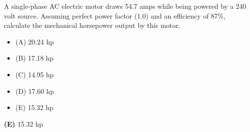 

A single-phase AC electric motor draws 54.7 amps while being powered by a 240 volt source.  Assuming perfect power factor (1.0) and an efficiency of 87\%, calculate the mechanical horsepower output by this motor.

\begin{itemize}
\item{(A)} 20.24 hp
\vskip 5pt 
\item{(B)} 17.18 hp
\vskip 5pt 
\item{(C)} 14.95 hp
\vskip 5pt 
\item{(D)} 17.60 hp
\vskip 5pt 
\item{(E)} 15.32 hp
\end{itemize}







{\bf (E)} 15.32 hp











